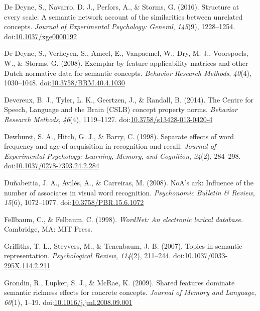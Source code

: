\documentclass[english,,man]{apa6}
\begin{document}
\leavevmode\hypertarget{ref-DeDeyne2016}{}%
De Deyne, S., Navarro, D. J., Perfors, A., \& Storms, G. (2016). Structure at every scale: A semantic network account of the similarities between unrelated concepts. \emph{Journal of Experimental Psychology: General}, \emph{145}(9), 1228--1254. doi:\href{https://doi.org/10.1037/xge0000192}{10.1037/xge0000192}

\leavevmode\hypertarget{ref-DeDeyne2008}{}%
De Deyne, S., Verheyen, S., Ameel, E., Vanpaemel, W., Dry, M. J., Voorspoels, W., \& Storms, G. (2008). Exemplar by feature applicability matrices and other Dutch normative data for semantic concepts. \emph{Behavior Research Methods}, \emph{40}(4), 1030--1048. doi:\href{https://doi.org/10.3758/BRM.40.4.1030}{10.3758/BRM.40.4.1030}

\leavevmode\hypertarget{ref-Devereux2014}{}%
Devereux, B. J., Tyler, L. K., Geertzen, J., \& Randall, B. (2014). The Centre for Speech, Language and the Brain (CSLB) concept property norms. \emph{Behavior Research Methods}, \emph{46}(4), 1119--1127. doi:\href{https://doi.org/10.3758/s13428-013-0420-4}{10.3758/s13428-013-0420-4}

\leavevmode\hypertarget{ref-Dewhurst1998}{}%
Dewhurst, S. A., Hitch, G. J., \& Barry, C. (1998). Separate effects of word frequency and age of acquisition in recognition and recall. \emph{Journal of Experimental Psychology: Learning, Memory, and Cognition}, \emph{24}(2), 284--298. doi:\href{https://doi.org/10.1037/0278-7393.24.2.284}{10.1037/0278-7393.24.2.284}

\leavevmode\hypertarget{ref-Dunabeitia2008}{}%
Duñabeitia, J. A., Avilés, A., \& Carreiras, M. (2008). NoA's ark: Influence of the number of associates in visual word recognition. \emph{Psychonomic Bulletin \& Review}, \emph{15}(6), 1072--1077. doi:\href{https://doi.org/10.3758/PBR.15.6.1072}{10.3758/PBR.15.6.1072}

\leavevmode\hypertarget{ref-Felbaum1998}{}%
Fellbaum, C., \& Felbaum, C. (1998). \emph{WordNet: An electronic lexical database}. Cambridge, MA: MIT Press.

\leavevmode\hypertarget{ref-Griffiths2007}{}%
Griffiths, T. L., Steyvers, M., \& Tenenbaum, J. B. (2007). Topics in semantic representation. \emph{Psychological Review}, \emph{114}(2), 211--244. doi:\href{https://doi.org/10.1037/0033-295X.114.2.211}{10.1037/0033-295X.114.2.211}

\leavevmode\hypertarget{ref-Grondin2009}{}%
Grondin, R., Lupker, S. J., \& McRae, K. (2009). Shared features dominate semantic richness effects for concrete concepts. \emph{Journal of Memory and Language}, \emph{60}(1), 1--19. doi:\href{https://doi.org/10.1016/j.jml.2008.09.001}{10.1016/j.jml.2008.09.001}
\end{document}
